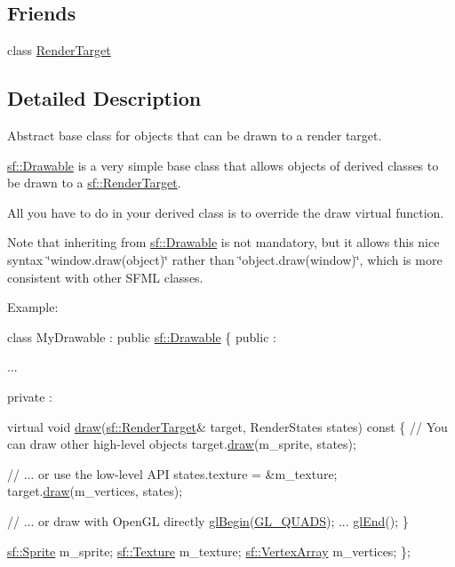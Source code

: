 \subsection*{Friends}
\begin{DoxyCompactItemize}
\item 
class \hyperlink{classsf_1_1_drawable_aa5afc6f82b7b587ed5ada4d227ce32aa}{Render\-Target}
\end{DoxyCompactItemize}


\subsection{Detailed Description}
Abstract base class for objects that can be drawn to a render target. 

\hyperlink{classsf_1_1_drawable}{sf\-::\-Drawable} is a very simple base class that allows objects of derived classes to be drawn to a \hyperlink{classsf_1_1_render_target}{sf\-::\-Render\-Target}.

All you have to do in your derived class is to override the draw virtual function.

Note that inheriting from \hyperlink{classsf_1_1_drawable}{sf\-::\-Drawable} is not mandatory, but it allows this nice syntax \char`\"{}window.\-draw(object)\char`\"{} rather than \char`\"{}object.\-draw(window)\char`\"{}, which is more consistent with other S\-F\-M\-L classes.

Example\-: 
\begin{DoxyCode}
\textcolor{keyword}{class }MyDrawable : \textcolor{keyword}{public} \hyperlink{classsf_1_1_drawable}{sf::Drawable}
\{
\textcolor{keyword}{public} :

   ...

private :

    \textcolor{keyword}{virtual} \textcolor{keywordtype}{void} \hyperlink{classsf_1_1_drawable_a90d2c88bba9b035a0844eccb380ef631}{draw}(\hyperlink{classsf_1_1_render_target}{sf::RenderTarget}& target, RenderStates states)\textcolor{keyword}{ const}
\textcolor{keyword}{    }\{
        \textcolor{comment}{// You can draw other high-level objects}
        target.\hyperlink{classsf_1_1_render_target_a12417a3bcc245c41d957b29583556f39}{draw}(m\_sprite, states);

        \textcolor{comment}{// ... or use the low-level API}
        states.texture = &m\_texture;
        target.\hyperlink{classsf_1_1_render_target_a12417a3bcc245c41d957b29583556f39}{draw}(m\_vertices, states);

        \textcolor{comment}{// ... or draw with OpenGL directly}
        \hyperlink{gl_8h_a78d1cc551d8585ab6aee14f75cd6671f}{glBegin}(\hyperlink{gl_8h_a36b428225d54dd9cf2e564e5ada3ad3d}{GL\_QUADS});
        ...
        \hyperlink{gl_8h_af50123535ec586f448744e0bc5a35923}{glEnd}();
    \}

    \hyperlink{classsf_1_1_sprite}{sf::Sprite} m\_sprite;
    \hyperlink{classsf_1_1_texture}{sf::Texture} m\_texture;
    \hyperlink{classsf_1_1_vertex_array}{sf::VertexArray} m\_vertices;
\};
\end{DoxyCode}


